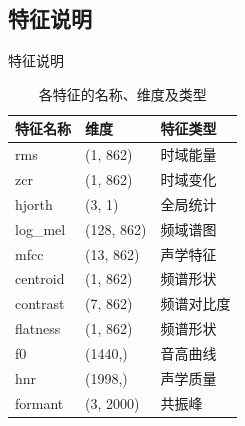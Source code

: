 \documentclass[aspectratio=169]{beamer}
\begin{document}
%

\subsection{特征说明}
\begin{frame}{特征说明}
\begin{table}
  \centering
  \begin{tabular}{lll}
    \toprule
    特征名称 & 维度 & 特征类型 \\
    \midrule
    rms       & (1, 862)   & 时域能量 \\
    zcr       & (1, 862)   & 时域变化 \\
    hjorth    & (3, 1)     & 全局统计 \\
    log\_mel  & (128, 862) & 频域谱图 \\
    mfcc      & (13, 862)  & 声学特征 \\
    centroid  & (1, 862)   & 频谱形状 \\
    contrast  & (7, 862)   & 频谱对比度 \\
    flatness  & (1, 862)   & 频谱形状 \\
    f0        & (1440,)    & 音高曲线 \\
    hnr       & (1998,)    & 声学质量 \\
    formant   & (3, 2000)  & 共振峰 \\
    \bottomrule
  \end{tabular}
  \caption{各特征的名称、维度及类型}\label{tab:audio-features}
\end{table}
\end{frame}
\end{document}
